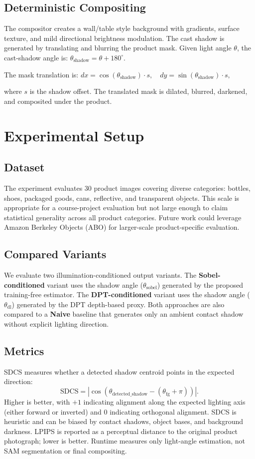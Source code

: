 \documentclass{article}
\begin{document}
\subsection{Deterministic Compositing}
The compositor creates a wall/table style background with gradients, surface texture, and mild directional brightness modulation. The cast shadow is generated by translating and blurring the product mask. Given light angle $\theta$, the cast-shadow angle is: $ \theta_{\mathrm{shadow}} = \theta + 180^\circ. $ 

The mask translation is:
$    dx = \cos(\theta_{\mathrm{shadow}}) \cdot s,\quad
    dy = \sin(\theta_{\mathrm{shadow}}) \cdot s,
$


where $s$ is the shadow offset. The translated mask is dilated, blurred, darkened, and composited under the product.

\section{Experimental Setup}
\subsection{Dataset}
The experiment evaluates 30 product images covering diverse categories: bottles, shoes, packaged goods, cans, reflective, and transparent objects. This scale is appropriate for a course-project evaluation but not large enough to claim statistical generality across all product categories. Future work could leverage Amazon Berkeley Objects (ABO) for larger-scale product-specific evaluation.

\subsection{Compared Variants}
We evaluate two illumination-conditioned output variants. The \textbf{Sobel-conditioned} variant uses the shadow angle ($\theta_{\mathrm{sobel}}$) generated by the proposed training-free estimator. The \textbf{DPT-conditioned} variant uses the shadow angle ($\theta_{\mathrm{dl}}$) generated by the DPT depth-based proxy. Both approaches are also compared to a \textbf{Naive} baseline that generates only an ambient contact shadow without explicit lighting direction.

\subsection{Metrics}
SDCS measures whether a detected shadow centroid points in the expected direction:
\begin{equation}
    \mathrm{SDCS} = |\cos(\theta_{\mathrm{detected\_shadow}} - (\theta_{\mathrm{fg}} + \pi))|.
\end{equation}
Higher is better, with $+1$ indicating alignment along the expected lighting axis (either forward or inverted) and $0$ indicating orthogonal alignment. SDCS is heuristic and can be biased by contact shadows, object bases, and background darkness. LPIPS is reported as a perceptual distance to the original product photograph; lower is better. Runtime measures only light-angle estimation, not SAM segmentation or final compositing.
\end{document}
